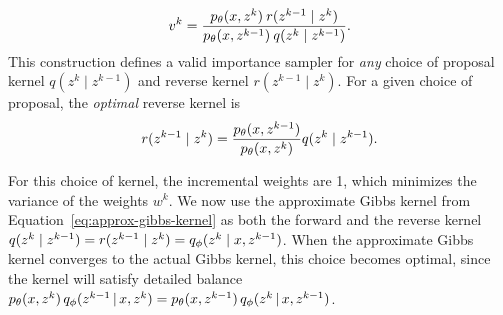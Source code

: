 \documentclass[anonymous=false, %
               format=acmsmall, %
               review=true, %
               screen=true, %
               nonacm=true]{acmart}
\theoremstyle{definition}
\begin{document}
\begin{align}
    \label{eq:incremental-weight-forward-reverse}
    v^k 
    = 
    \frac{p_\theta(x,z^k) \: r(z^{k-1} \mid  z^k)}
         {p_\theta(x,z^{k-1}) \: q(z^{k} \mid  z^{k-1})}
    .
\end{align}
This construction defines a valid importance sampler for \emph{any} choice of proposal kernel $q(z^k \mid z^{k-1})$ and reverse kernel $r(z^{k-1} \mid z^{k})$. For a given choice of proposal, the \emph{optimal} reverse kernel is
\begin{align*}
    r(z^{k-1} \mid  z^k)
    =   
    \frac{p_\theta(x,z^{k-1})}
         {p_\theta(x,z^k)}
    q(z^{k} \mid  z^{k-1})
    .
\end{align*}

For this choice of kernel, the incremental weights are 1, which minimizes the variance of the weights $w^k$.
We now use the approximate Gibbs kernel from Equation~\ref{eq:approx-gibbs-kernel} as both the forward and the reverse kernel $q(z^{k} \mid  z^{k-1}) = r(z^{k-1} \mid  z^k) = q_\phi(z^k \mid x, z^{k-1})$. When the approximate Gibbs kernel converges to the actual Gibbs kernel, this choice becomes optimal, since the kernel will satisfy detailed balance $p_\theta(x, z^k)\,q_\phi(z^{k-1} \,|\, x, z^{k}) = p_\theta(x, z^{k-1})\,q_\phi(z^{k} \,|\, x, z^{k-1})$.
\end{document}
